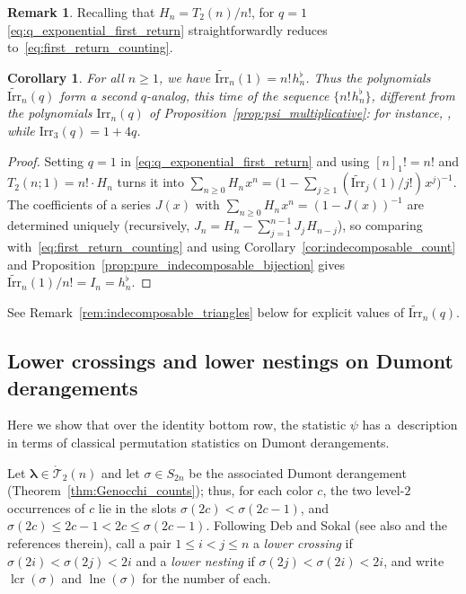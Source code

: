 \documentclass[10pt,a4paper]{amsart}
\numberwithin{equation}{section}
\newcommand{\ssp}{\hspace{1pt}}
\newtheorem{Corollary}[Theorem]{Corollary}
\theoremstyle{definition}
\newtheorem{Remark}[Theorem]{Remark}
\begin{document}
\begin{Remark}
Recalling that $H_n=T_2(n)/n!$, for $q=1$ \eqref{eq:q_exponential_first_return} straightforwardly reduces to~\eqref{eq:first_return_counting}.
\end{Remark}
\begin{Corollary}
	\label{cor:q_analog_full_hflat}
	For all $n\ge1$, we have
	$\widetilde{\mathrm{Irr}}_n(1)=n!\ssp h^\flat_n$.
	Thus the polynomials $\widetilde{\mathrm{Irr}}_n(q)$ form a second
	$q$-analog, this time of the sequence $\{n!\ssp h^\flat_n\}$,
	different from the polynomials $\mathrm{Irr}_n(q)$ of
	Proposition~{\rm \ref{prop:psi_multiplicative}}: for instance,
	, while
	$\mathrm{Irr}_3(q)=1+4q$.
\end{Corollary}
\begin{proof}
	Setting $q=1$ in \eqref{eq:q_exponential_first_return} and using
	$[n]_1!=n!$ and $T_2(n;1)=n!\cdot H_n$ turns it into
	$\sum_{n\ge0}H_n\ssp x^n
	=\bigl(1-\sum_{j\ge1}(\widetilde{\mathrm{Irr}}_j(1)/j!)\ssp
	x^j\bigr)^{-1}$.
	The coefficients of a series $J(x)$ with
	$\sum_{n\ge0}H_n\ssp x^n=(1-J(x))^{-1}$ are determined uniquely
	(recursively, $J_n=H_n-\sum_{j=1}^{n-1}J_j\ssp H_{n-j}$), so
	comparing with~\eqref{eq:first_return_counting} and using
	Corollary~\ref{cor:indecomposable_count} and Proposition~\ref{prop:pure_indecomposable_bijection}
	gives $\widetilde{\mathrm{Irr}}_n(1)/n!=I_n=h^\flat_n$.
\end{proof}

See Remark~\ref{rem:indecomposable_triangles} below for explicit values of
$\widetilde{\mathrm{Irr}}_n(q)$.

\subsection{Lower crossings and lower nestings on Dumont derangements}
\label{subsec:crossings_nestings}

Here we show that over the identity bottom row, the
statistic $\psi$ has a~description in terms of classical
permutation statistics on Dumont derangements.

Let $\boldsymbol\lambda\in\mathring{\mathcal{T}}_2(n)$ and let $\sigma\in
S_{2n}$ be the associated Dumont derangement (Theorem~\ref{thm:Genocchi_counts});
thus, for each color $c$, the two level-$2$ occurrences of $c$ lie in the
slots $\sigma(2c)<\sigma(2c-1)$, and $\sigma(2c)\le 2c-1<2c\le\sigma(2c-1)$.
Following Deb and Sokal \cite{DebSokal2024} (see also \cite{SokalZeng2022} and the references therein), call a pair $1\le i<j\le n$ a
\emph{lower crossing} if $\sigma(2i)<\sigma(2j)<2i$ and a \emph{lower
nesting} if $\sigma(2j)<\sigma(2i)<2i$, and write
$\operatorname{lcr}(\sigma)$ and $\operatorname{lne}(\sigma)$ for the number
of each.
\end{document}
